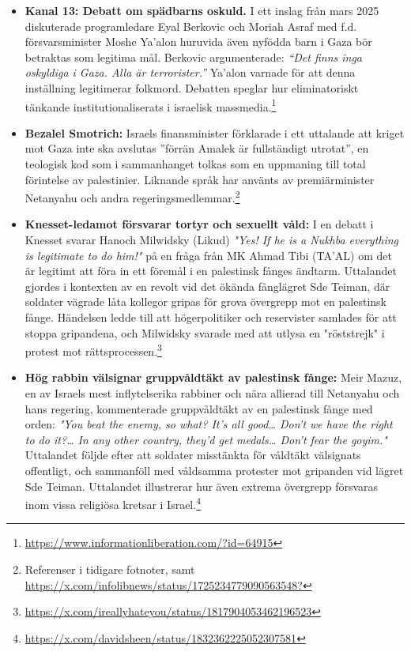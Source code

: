 \begin{itemize}
\item \textbf{Kanal 13: Debatt om spädbarns oskuld.} I ett inslag från mars 2025 diskuterade programledare Eyal Berkovic och Moriah Asraf med f.d. försvarsminister Moshe Ya’alon huruvida även nyfödda barn i Gaza bör betraktas som legitima mål. Berkovic argumenterade: \textit{“Det finns inga oskyldiga i Gaza. Alla är terrorister.”} Ya’alon varnade för att denna inställning legitimerar folkmord. Debatten speglar hur eliminatoriskt tänkande institutionaliserats i israelisk massmedia.\footnote{\url{https://www.informationliberation.com/?id=64915}}

\item \textbf{Bezalel Smotrich:} Israels finansminister förklarade i ett uttalande att kriget mot Gaza inte ska avslutas ”förrän Amalek är fullständigt utrotat”, en teologisk kod som i sammanhanget tolkas som en uppmaning till total förintelse av palestinier. Liknande språk har använts av premiärminister Netanyahu och andra regeringsmedlemmar.\footnote{Referenser i tidigare fotnoter, samt \url{https://x.com/infolibnews/status/1725234779090563548?}}

\item \textbf{Knesset-ledamot försvarar tortyr och sexuellt våld:} I en debatt i Knesset svarar Hanoch Milwidsky (Likud) \textit{"Yes! If he is a Nukhba everything is legitimate to do him!"} på en fråga från MK Ahmad Tibi (TA'AL) om det är legitimt att föra in ett föremål i en palestinsk fånges ändtarm. Uttalandet gjordes i kontexten av en revolt vid det ökända fånglägret Sde Teiman, där soldater vägrade låta kollegor gripas för grova övergrepp mot en palestinsk fånge. Händelsen ledde till att högerpolitiker och reservister samlades för att stoppa gripandena, och Milwidsky svarade med att utlysa en "röststrejk" i protest mot rättsprocessen.\footnote{\url{https://x.com/ireallyhateyou/status/1817904053462196523}}

\item \textbf{Hög rabbin välsignar gruppvåldtäkt av palestinsk fånge:} Meir Mazuz, en av Israels mest inflytelserika rabbiner och nära allierad till Netanyahu och hans regering, kommenterade gruppvåldtäkt av en palestinsk fånge med orden: \textit{"You beat the enemy, so what? It's all good… Don't we have the right to do it?… In any other country, they'd get medals… Don't fear the goyim."} Uttalandet följde efter att soldater misstänkta för våldtäkt välsignats offentligt, och sammanföll med våldsamma protester mot gripanden vid lägret Sde Teiman. Uttalandet illustrerar hur även extrema övergrepp försvaras inom vissa religiösa kretsar i Israel.\footnote{\url{https://x.com/davidsheen/status/1832362225052307581}}


\end{itemize}
